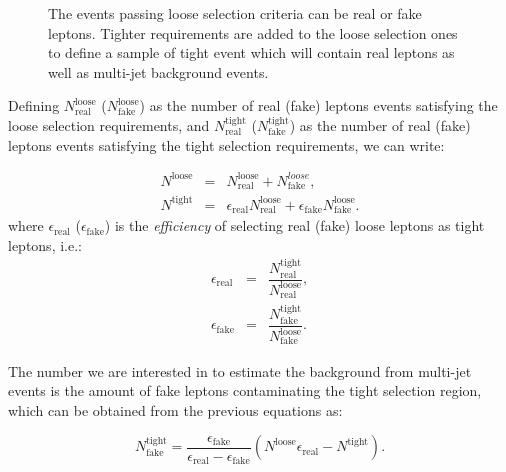 \begin{figure}[htb]\begin{center}
	\caption{The events passing loose selection criteria can be real or fake leptons.
        Tighter requirements are added to the loose selection ones to define a sample of
        tight event which will contain real leptons as well as multi-jet background events.}
\end{center}\end{figure}

Defining $N^\mathrm{loose}_\mathrm{real}$ ($N^\mathrm{loose}_\mathrm{fake}$) as the number of
real (fake) leptons events satisfying the loose selection requirements, and
$N^\mathrm{tight}_\mathrm{real}$ ($N^\mathrm{tight}_\mathrm{fake}$) as the number of
real (fake) leptons events satisfying the tight selection requirements, we can write:

\begin{eqnarray}
\label{eqn:intro-mm-Nloose}
N^\mathrm{loose} & = & N^\mathrm{loose}_\mathrm{real} + N^{loose}_\mathrm{fake}, \\
\label{eqn:intro-mm-Ntight}
N^\mathrm{tight} & = & \epsilon_\mathrm{real}N^\mathrm{loose}_\mathrm{real} + \epsilon_\mathrm{fake}N^\mathrm{loose}_\mathrm{fake}.
\end{eqnarray}
where $\epsilon_\mathrm{real}$ ($\epsilon_\mathrm{fake}$) is the 
{\it efficiency} of selecting real (fake) loose leptons as tight leptons, i.e.:
\begin{eqnarray}
\label{eqn:intro-mm-real}
\epsilon_\mathrm{real} & = & \dfrac{N^\mathrm{tight}_\mathrm{real}}{N^\mathrm{loose}_\mathrm{real}}, \\
\label{eqn:intro-mm-fake}
\epsilon_\mathrm{fake} & = & \dfrac{N^\mathrm{tight}_\mathrm{fake}}{N^\mathrm{loose}_\mathrm{fake}}.
\end{eqnarray}


The number we are interested in to estimate the background from
multi-jet events is the amount of fake leptons contaminating the 
tight selection region, which can be obtained from
the previous equations as:

\begin{equation}
N^\mathrm{tight}_\mathrm{fake} = \frac{\epsilon_\mathrm{fake}}{\epsilon_\mathrm{real} - \epsilon_\mathrm{fake}}(N^\mathrm{loose} \epsilon_\mathrm{real} - N^\mathrm{tight}).
\label{eqn:intro-mm-tight_fake}
\end{equation}


